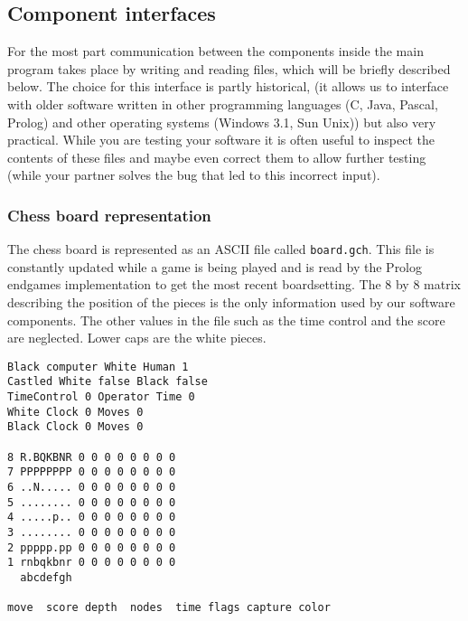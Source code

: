 \documentclass[10pt]{scrartcl}
\begin{document}
\subsection{Component interfaces}

For the most part communication between the components inside the main program 
takes place by writing and reading files, which will be
briefly described below. The choice for this interface is partly historical,
(it allows us to interface with older software written in other programming languages (C, Java, Pascal, Prolog) 
and other operating systems (Windows 3.1, Sun Unix)) but also very practical.
While you are testing your software it is often useful to inspect 
the contents of these files and maybe even correct them to allow further testing 
(while your partner solves the bug that led to this incorrect input).

\subsubsection{Chess board representation}
\label{sec:chess-board-repr}

The chess board is represented as an ASCII file called \verb|board.gch|.
This file is constantly updated while a game is being played and is read
by the Prolog endgames implementation
to get the most recent boardsetting.  The 8 by 8 matrix describing the
position of the pieces is the only information used by our software
components. The other values in the file such as the time control and
the score are neglected. Lower caps are the white pieces. 

\begin{minipage}{\textwidth} %
\begin{verbatim}
Black computer White Human 1
Castled White false Black false
TimeControl 0 Operator Time 0
White Clock 0 Moves 0
Black Clock 0 Moves 0

8 R.BQKBNR 0 0 0 0 0 0 0 0 
7 PPPPPPPP 0 0 0 0 0 0 0 0
6 ..N..... 0 0 0 0 0 0 0 0
5 ........ 0 0 0 0 0 0 0 0
4 .....p.. 0 0 0 0 0 0 0 0
3 ........ 0 0 0 0 0 0 0 0
2 ppppp.pp 0 0 0 0 0 0 0 0
1 rnbqkbnr 0 0 0 0 0 0 0 0
  abcdefgh

move  score depth  nodes  time flags capture color
\end{verbatim}
\end{minipage}
\end{document}

